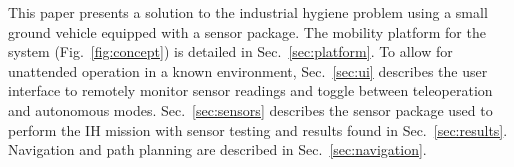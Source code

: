 This paper presents a solution to the industrial hygiene problem using a small ground vehicle equipped with a sensor package. The mobility platform for the system (Fig.~\ref{fig:concept}) is detailed in Sec.~\ref{sec:platform}. To allow for unattended operation in a known environment, Sec.~\ref{sec:ui} describes the user interface to remotely monitor sensor readings and toggle between teleoperation and autonomous modes. Sec.~\ref{sec:sensors} describes the sensor package used to perform the IH mission with sensor testing and results found in Sec.~\ref{sec:results}. Navigation and path planning are described in Sec.~\ref{sec:navigation}.